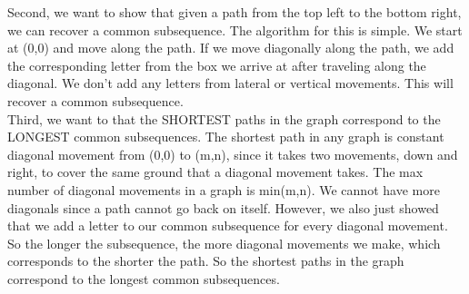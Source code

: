 \documentclass[12pt]{article}
\begin{document}
\begin{enumerate}
    Second, we want to show that given a path from the top left to the bottom right, we can recover a common subsequence. The algorithm for this is simple. We start at (0,0) and move along the path. If we move diagonally along the path, we add the corresponding letter from the box we arrive at after traveling along the diagonal. We don't add any letters from lateral or vertical movements. This will recover a common subsequence.\\

    Third, we want to that the SHORTEST paths in the graph correspond to the LONGEST common subsequences. The shortest path in any graph is constant diagonal movement from (0,0) to (m,n), since it takes two movements, down and right, to cover the same ground that a diagonal movement takes. The max number of diagonal movements in a graph is min(m,n). We cannot have more diagonals since a path cannot go back on itself. However, we also just showed that we add a letter to our common subsequence for every diagonal movement. So the longer the subsequence, the more diagonal movements we make, which corresponds to the shorter the path. So the shortest paths in the graph correspond to the longest common subsequences.\\
\end{enumerate}
\end{document}
